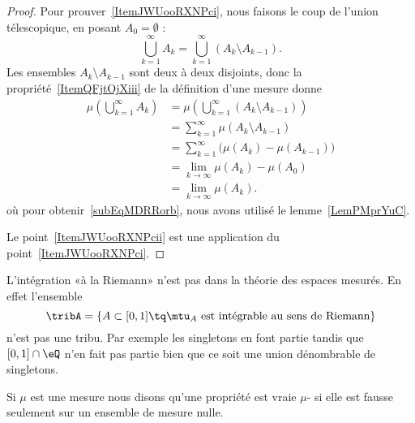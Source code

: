 \begin{proof}
	Pour prouver~\ref{ItemJWUooRXNPci}, nous faisons le coup de l'union télescopique, en posant \( A_0=\emptyset\) :
	\begin{equation}
		\bigcup_{k=1}^{\infty}A_k=\bigcup_{k=1}^{\infty}(A_k\setminus A_{k-1}).
	\end{equation}
	Les ensembles \( A_k\setminus A_{k-1}\) sont deux à deux disjoints, donc la propriété~\ref{ItemQFjtOjXiii} de la définition d'une mesure donne
	\begin{subequations}
		\begin{align}
			\mu(\bigcup_{k=1}^{\infty}A_k) & =\mu\left( \bigcup_{k=1}^{\infty}(A_k\setminus A_{k-1}) \right)              \\
			                               & =\sum_{k=1}^{\infty}\mu(A_k\setminus A_{k-1})                                \\
			                               & =\sum_{k=1}^{\infty}\big( \mu(A_k)-\mu(A_{k-1}) \big)   \label{subEqMDRRorb} \\
			                               & =\lim_{k\to \infty} \mu(A_k)-\mu(A_0)                                        \\
			                               & =\lim_{k\to \infty} \mu(A_k).
		\end{align}
	\end{subequations}
	où pour obtenir~\ref{subEqMDRRorb}, nous avons utilisé le lemme~\ref{LemPMprYuC}.

	Le point~\ref{ItemJWUooRXNPcii} est une application du point~\ref{ItemJWUooRXNPci}.
\end{proof}

\begin{example}
	L'intégration «à la Riemann» n'est pas dans la théorie des espaces mesurés. En effet l'ensemble
	\begin{equation}
		\tribA=\{   A\subset\mathopen[ 0 , 1 \mathclose]\tq   \mtu_A\text{ est intégrable au sens de Riemann}   \}
	\end{equation}
	n'est pas une tribu. Par exemple les singletons en font partie tandis que \( \mathopen[ 0 , 1 \mathclose]\cap \eQ\) n'en fait pas partie bien que ce soit une union dénombrable de singletons.
\end{example}

\begin{definition}
	Si \( \mu\) est une mesure nous disons qu'une propriété est vraie \( \mu\)- si elle est fausse seulement sur un ensemble de mesure nulle.
\end{definition}

